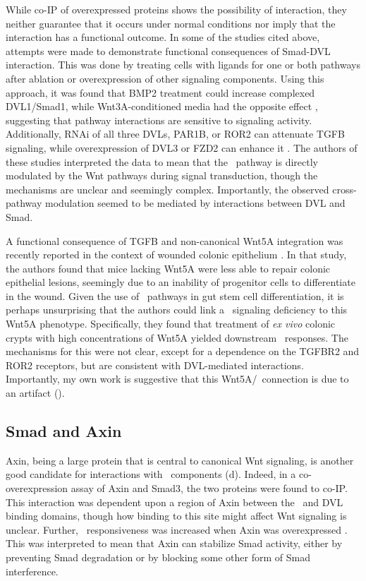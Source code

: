 While co-IP of overexpressed proteins shows the possibility of interaction,
they neither guarantee that it occurs under normal conditions
nor imply that the interaction has a functional outcome.
In some of the studies cited above, attempts were made
to demonstrate functional consequences of Smad-DVL interaction.
This was done by treating cells with ligands for one or both
pathways after ablation or overexpression of other signaling components.
Using this approach, it was found that BMP2 treatment
could increase complexed DVL1/Smad1, while
Wnt3A-conditioned media had the opposite effect \cite{Liu2006},
suggesting that pathway interactions are sensitive to signaling activity.
Additionally, RNAi of
all three DVLs, PAR1B, or ROR2 can attenuate TGFB signaling, while
overexpression of DVL3 or FZD2 can enhance it
\cite{Mamidi2012,Miyoshi2012}.
The authors of these studies interpreted the data to mean that the
\tgfbsf\ pathway is directly modulated by the Wnt pathways during
signal transduction, though the mechanisms are unclear and seemingly
complex. Importantly, the observed cross-pathway modulation seemed to be mediated
by interactions between DVL and Smad.


A functional consequence of TGFB and non-canonical Wnt5A
integration was recently reported in the context of wounded
colonic epithelium \cite{Miyoshi2012}. In that study, the
authors found that mice lacking Wnt5A were less able to repair
colonic epithelial lesions, seemingly due to an inability of
progenitor cells to differentiate in the wound. Given the use of
\tgfbsf\ pathways in gut stem cell differentiation, it is perhaps
unsurprising that the authors could link a \tgf\ signaling
deficiency to this Wnt5A phenotype. Specifically, they
found that treatment of \textit{ex vivo} colonic
crypts with high concentrations of Wnt5A yielded downstream
\tgf\ responses. The mechanisms for this were not clear, except
for a dependence on the TGFBR2 and ROR2 receptors, but are
consistent with DVL-mediated interactions. Importantly, my
own work is suggestive that this Wnt5A/\tgf\ connection is due to an artifact
().


\subsection{Smad and Axin}
\label{pathways:wntTgfb:axin}


Axin, being a large protein that is central
to canonical Wnt signaling, is another good candidate
for interactions with \tgfbsf\ components
(d). Indeed,
in a co-overexpression assay of Axin and Smad3,
the two proteins were found to co-IP. This interaction was
dependent upon a region of Axin between the \bcat\ and
DVL binding domains, though how binding to this site
might affect Wnt signaling is unclear.
Further, \tgf\ responsiveness was
increased when Axin was overexpressed \cite{Furuhashi2001}.
This was interpreted to mean that Axin can stabilize
Smad activity, either by preventing Smad degradation or
by blocking some other form of Smad interference. 


